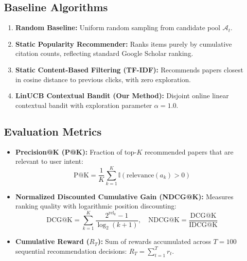 \documentclass[11pt,a4paper]{article}
\begin{document}
\subsection{Baseline Algorithms}
\begin{enumerate}[leftmargin=1.5em]
    \item \textbf{Random Baseline:} Uniform random sampling from candidate pool $\mathcal{A}_t$.
    \item \textbf{Static Popularity Recommender:} Ranks items purely by cumulative citation counts, reflecting standard Google Scholar ranking.
    \item \textbf{Static Content-Based Filtering (TF-IDF):} Recommends papers closest in cosine distance to previous clicks, with zero exploration.
    \item \textbf{LinUCB Contextual Bandit (Our Method):} Disjoint online linear contextual bandit with exploration parameter $\alpha = 1.0$.
\end{enumerate}

\subsection{Evaluation Metrics}
\begin{itemize}[leftmargin=1.5em]
    \item \textbf{Precision@K (P@K):} Fraction of top-$K$ recommended papers that are relevant to user intent:
    \begin{equation}
    \text{P@K} = \frac{1}{K} \sum_{k=1}^K \mathbb{I}(\text{relevance}(a_k) > 0)
    \end{equation}
    \item \textbf{Normalized Discounted Cumulative Gain (NDCG@K):} Measures ranking quality with logarithmic position discounting:
    \begin{equation}
    \text{DCG@K} = \sum_{k=1}^K \frac{2^{\text{rel}_k} - 1}{\log_2(k + 1)}, \quad \text{NDCG@K} = \frac{\text{DCG@K}}{\text{IDCG@K}}
    \end{equation}
    \item \textbf{Cumulative Reward ($R_T$):} Sum of rewards accumulated across $T = 100$ sequential recommendation decisions: $R_T = \sum_{t=1}^T r_t$.
\end{itemize}
\end{document}
